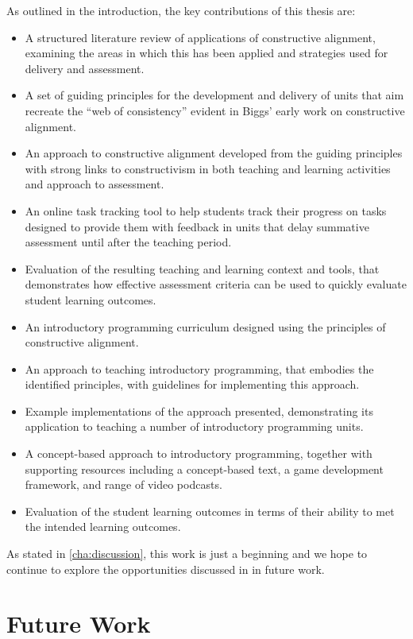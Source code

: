 As outlined in the introduction, the key contributions of this thesis are:
\begin{itemize}[noitemsep,nolistsep]
	\item A structured literature review of applications of constructive alignment, examining the areas in which this has been applied and strategies used for delivery and assessment.
	\item A set of guiding principles for the development and delivery of units that aim recreate the ``web of consistency'' evident in Biggs' early work on constructive alignment. 
	\item An approach to constructive alignment developed from the guiding principles with strong links to constructivism in both teaching and learning activities and approach to assessment.
	\item An online task tracking tool to help students track their progress on tasks designed to provide them with feedback in units that delay summative assessment until after the teaching period.
	\item Evaluation of the resulting teaching and learning context and tools, that demonstrates how effective assessment criteria can be used to quickly evaluate student learning outcomes.
	\item An introductory programming curriculum designed using the principles of constructive alignment.
	\item An approach to teaching introductory programming, that embodies the identified principles, with guidelines for implementing this approach.
	\item Example implementations of the approach presented, demonstrating its application to teaching a number of introductory programming units.
	\item A concept-based approach to introductory programming, together with supporting resources including a concept-based text, a game development framework, and range of video podcasts.
	\item Evaluation of the student learning outcomes in terms of their ability to met the intended learning outcomes.
\end{itemize}

As stated in \cref{cha:discussion}, this work is just a beginning and we hope to continue to explore the opportunities discussed in  in future work.

\section{Future Work} %
\label{sec:future_work}

